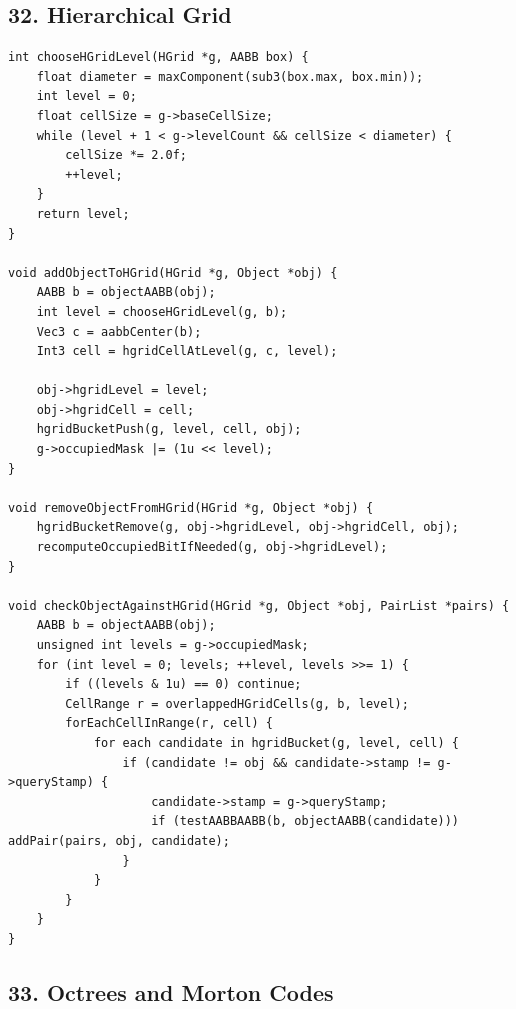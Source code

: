 \documentclass[10pt,letterpaper]{article}
\begin{document}
\subsection*{32. Hierarchical Grid}

\begin{verbatim}
int chooseHGridLevel(HGrid *g, AABB box) {
    float diameter = maxComponent(sub3(box.max, box.min));
    int level = 0;
    float cellSize = g->baseCellSize;
    while (level + 1 < g->levelCount && cellSize < diameter) {
        cellSize *= 2.0f;
        ++level;
    }
    return level;
}

void addObjectToHGrid(HGrid *g, Object *obj) {
    AABB b = objectAABB(obj);
    int level = chooseHGridLevel(g, b);
    Vec3 c = aabbCenter(b);
    Int3 cell = hgridCellAtLevel(g, c, level);

    obj->hgridLevel = level;
    obj->hgridCell = cell;
    hgridBucketPush(g, level, cell, obj);
    g->occupiedMask |= (1u << level);
}

void removeObjectFromHGrid(HGrid *g, Object *obj) {
    hgridBucketRemove(g, obj->hgridLevel, obj->hgridCell, obj);
    recomputeOccupiedBitIfNeeded(g, obj->hgridLevel);
}

void checkObjectAgainstHGrid(HGrid *g, Object *obj, PairList *pairs) {
    AABB b = objectAABB(obj);
    unsigned int levels = g->occupiedMask;
    for (int level = 0; levels; ++level, levels >>= 1) {
        if ((levels & 1u) == 0) continue;
        CellRange r = overlappedHGridCells(g, b, level);
        forEachCellInRange(r, cell) {
            for each candidate in hgridBucket(g, level, cell) {
                if (candidate != obj && candidate->stamp != g->queryStamp) {
                    candidate->stamp = g->queryStamp;
                    if (testAABBAABB(b, objectAABB(candidate))) addPair(pairs, obj, candidate);
                }
            }
        }
    }
}
\end{verbatim}


\subsection*{33. Octrees and Morton Codes}
\end{document}
